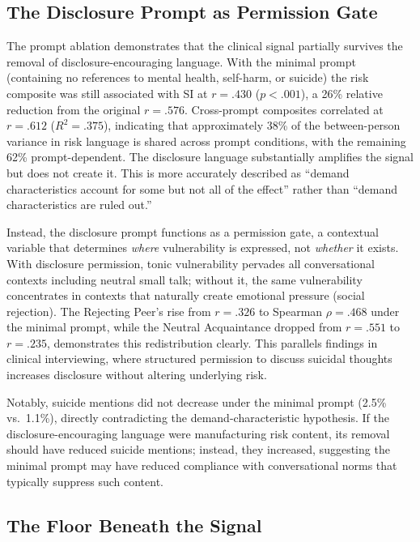\documentclass[review,12pt,authoryear]{elsarticle}
\begin{document}
\subsection{The Disclosure Prompt as Permission Gate}

The prompt ablation demonstrates that the clinical signal partially survives the removal of disclosure-encouraging language. With the minimal prompt (containing no references to mental health, self-harm, or suicide) the risk composite was still associated with SI at $r = .430$ ($p < .001$), a 26\% relative reduction from the original $r = .576$. Cross-prompt composites correlated at $r = .612$ ($R^2 = .375$), indicating that approximately 38\% of the between-person variance in risk language is shared across prompt conditions, with the remaining 62\% prompt-dependent. The disclosure language substantially amplifies the signal but does not create it. This is more accurately described as ``demand characteristics account for some but not all of the effect'' rather than ``demand characteristics are ruled out.''

Instead, the disclosure prompt functions as a permission gate, a contextual variable that determines \textit{where} vulnerability is expressed, not \textit{whether} it exists. With disclosure permission, tonic vulnerability pervades all conversational contexts including neutral small talk; without it, the same vulnerability concentrates in contexts that naturally create emotional pressure (social rejection). The Rejecting Peer's rise from $r = .326$ to Spearman $\rho = .468$ under the minimal prompt, while the Neutral Acquaintance dropped from $r = .551$ to $r = .235$, demonstrates this redistribution clearly. This parallels findings in clinical interviewing, where structured permission to discuss suicidal thoughts increases disclosure without altering underlying risk.

Notably, suicide mentions did not decrease under the minimal prompt (2.5\% vs.\ 1.1\%), directly contradicting the demand-characteristic hypothesis. If the disclosure-encouraging language were manufacturing risk content, its removal should have reduced suicide mentions; instead, they increased, suggesting the minimal prompt may have reduced compliance with conversational norms that typically suppress such content.

\subsection{The Floor Beneath the Signal}
\end{document}
